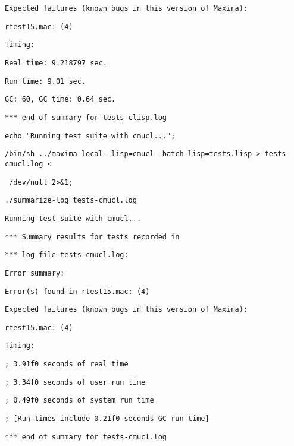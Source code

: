 \vspace{2ex}

\texttt{Expected failures (known bugs in this version of Maxima):}

\texttt{rtest15.mac: (4)}

\vspace{2ex}

\texttt{Timing:}

\texttt{Real time: 9.218797 sec.}

\texttt{Run time: 9.01 sec.}

\texttt{GC: 60, GC time: 0.64 sec.}

\texttt{*** end of summary for tests-clisp.log}

\vspace{2ex}

\texttt{echo "Running test suite with cmucl..."; \ }

\texttt{/bin/sh ../maxima-local --lisp=cmucl --batch-lisp=tests.lisp > tests-cmucl.log < }

\texttt{ /dev/null 2>\&1; \ }
 
\texttt{./summarize-log tests-cmucl.log}

\texttt{Running test suite with cmucl...}

\vspace{2ex}

\texttt{*** Summary results for tests recorded in}

\texttt{*** log file tests-cmucl.log:}

\texttt{Error summary:}

\texttt{Error(s) found in rtest15.mac: (4)}

\vspace{2ex}

\texttt{Expected failures (known bugs in this version of Maxima):}

\texttt{rtest15.mac: (4)}

\vspace{2ex}

\texttt{Timing:}

\texttt{;   3.91f0 seconds of real time}

\texttt{;   3.34f0 seconds of user run time}

\texttt{;   0.49f0 seconds of system run time}

\texttt{;   [Run times include 0.21f0 seconds GC run time]}

\texttt{*** end of summary for tests-cmucl.log}

\vspace{2ex}

